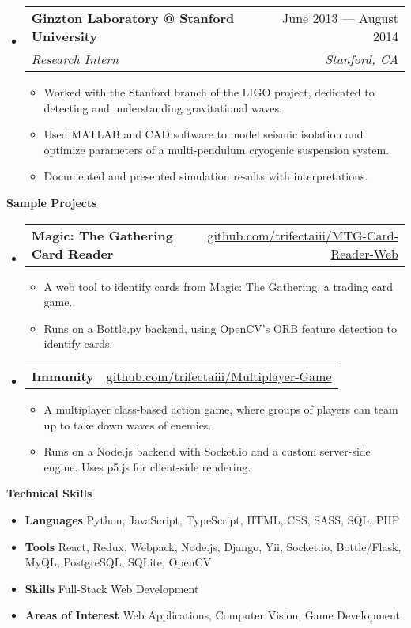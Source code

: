 \documentclass[letterpaper,12pt]{article}[leftmargin=*]
\makeatletter
\def \entryspacing {-0pt}
\renewcommand{\section}[2]{\vspace{5pt}
  \colorbox{secondary}{\color{white}\raggedbottom\normalsize\textbf{{#1}{\hspace{7pt}#2}}}
}
\newcommand{\resumeEntryStart}{\begin{itemize}[leftmargin=2.5mm]}
\newcommand{\resumeEntryEnd}{\end{itemize}\vspace{\entryspacing}}
\newcommand{\resumeItemListStart}{\begin{itemize}[leftmargin=4.5mm]}
\newcommand{\resumeItemListEnd}{\end{itemize}}
\newcommand{\resumeItem}[1]{
  \item{%
    {#1 \vspace{-2pt}}
  }
}
\newcommand{\resumeEntryTSDL}[4]{
  \vspace{-1pt}\item[]
    \begin{tabular*}{0.97\textwidth}{l@{\extracolsep{\fill}}r}
      \textbf{\color{primary}#1} & {\firabook\color{accent}\small#2} \\
      \textit{\color{accent}\small#3} & \textit{\color{accent}\small#4} \\
    \end{tabular*}\vspace{-6pt}
}
\newcommand{\resumeEntryTD}[2]{
  \vspace{-1pt}\item[]
    \begin{tabular*}{0.97\textwidth}{l@{\extracolsep{\fill}}r}
      \textbf{\color{primary}#1} & {\firabook\color{accent}\small#2} \\
    \end{tabular*}\vspace{-6pt}
}
\newcommand{\resumeEntryS}[2]{
  \item[]\small{
    \textbf{\color{primary}#1 }{ #2 \vspace{-6pt}}
  }
}
\makeatother
\begin{document}
  \resumeEntryStart
    \resumeEntryTSDL
      {Ginzton Laboratory @ Stanford University}{June 2013 --- August 2014}
      {Research Intern}{Stanford, CA}
    \resumeItemListStart
      \resumeItem {Worked with the Stanford branch of the LIGO project, dedicated to detecting and understanding gravitational waves.}
      \resumeItem {Used MATLAB and CAD software to model seismic isolation and optimize parameters
of a multi-pendulum cryogenic suspension system.}
      \resumeItem {Documented and presented simulation results with interpretations.}
    \resumeItemListEnd
  \resumeEntryEnd


\section{\faFlask}{Sample Projects}

  \resumeEntryStart
    \resumeEntryTD
      {Magic: The Gathering Card Reader}{\href{https://github.com/trifectaiii/MTG-Card-Reader-Web}{github.com/trifectaiii/MTG-Card-Reader-Web}}
    \resumeItemListStart
      \resumeItem {A web tool to identify cards from Magic: The Gathering, a trading card game.}
      \resumeItem {Runs on a Bottle.py backend, using OpenCV's ORB feature detection to identify cards.}
    \resumeItemListEnd
  \resumeEntryEnd
  
  \resumeEntryStart
    \resumeEntryTD
      {Immunity}{\href{https://github.com/trifectaiii/Multiplayer-Game}{github.com/trifectaiii/Multiplayer-Game}}
    \resumeItemListStart
      \resumeItem {A multiplayer class-based action game, where groups of players can team up to take down waves of enemies.}
      \resumeItem {Runs on a Node.js backend with Socket.io and a custom server-side engine. Uses p5.js for client-side rendering.}
    \resumeItemListEnd
  \resumeEntryEnd

\section{\faGears}{Technical Skills}
 \resumeEntryStart
  \resumeEntryS{Languages } {Python, JavaScript, TypeScript, HTML, CSS, SASS, SQL, PHP}
  \resumeEntryS{Tools } {React, Redux, Webpack, Node.js, Django, Yii, Socket.io, Bottle/Flask, MyQL, PostgreSQL, SQLite, OpenCV}
  \resumeEntryS{Skills } {Full-Stack Web Development}
  \resumeEntryS{Areas of Interest } {Web Applications, Computer Vision, Game Development}
 \resumeEntryEnd
 
\begin{center}
\begin{scriptsize}
\end{scriptsize}
\end{center}
\end{document}
